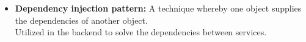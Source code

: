 \begin{itemize}
    \item
    \textbf{Dependency injection pattern:} A technique whereby one object supplies the dependencies of another object.\\
    Utilized in the backend to solve the dependencies between services.



\end{itemize}